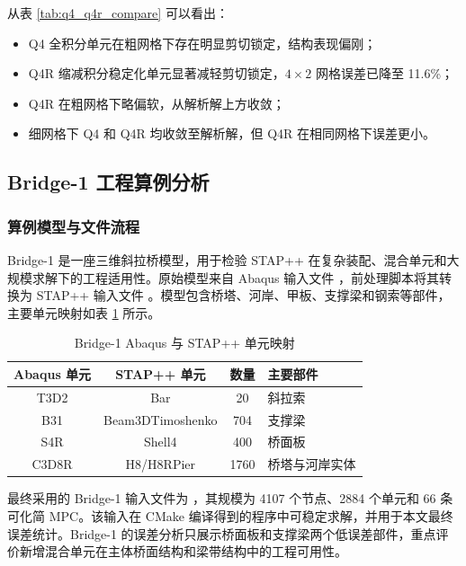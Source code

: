 \documentclass[UTF8,a4paper,zihao=-4]{ctexart}
\begin{document}
从表 \ref{tab:q4_q4r_compare} 可以看出：

\begin{itemize}
    \item Q4 全积分单元在粗网格下存在明显剪切锁定，结构表现偏刚；
    \item Q4R 缩减积分稳定化单元显著减轻剪切锁定，$4\times2$ 网格误差已降至 11.6\%；
    \item Q4R 在粗网格下略偏软，从解析解上方收敛；
    \item 细网格下 Q4 和 Q4R 均收敛至解析解，但 Q4R 在相同网格下误差更小。
\end{itemize}

\subsection{Bridge-1 工程算例分析}

\subsubsection{算例模型与文件流程}

Bridge-1 是一座三维斜拉桥模型，用于检验 STAP++ 在复杂装配、混合单元和大规模求解下的工程适用性。原始模型来自 Abaqus 输入文件 ，前处理脚本将其转换为 STAP++ 输入文件 。模型包含桥塔、河岸、甲板、支撑梁和钢索等部件，主要单元映射如表 \ref{tab:bridge1_mapping} 所示。

\begin{table}[H]
    \centering
    \caption{Bridge-1 Abaqus 与 STAP++ 单元映射}
    \label{tab:bridge1_mapping}
    \begin{tabular}{cccl}
        \toprule
        Abaqus 单元 & STAP++ 单元 & 数量 & 主要部件\\
        \midrule
        T3D2 & Bar & 20 & 斜拉索\\
        B31 & Beam3DTimoshenko & 704 & 支撑梁\\
        S4R & Shell4 & 400 & 桥面板\\
        C3D8R & H8/H8RPier & 1760 & 桥塔与河岸实体\\
        \bottomrule
    \end{tabular}
\end{table}

最终采用的 Bridge-1 输入文件为 ，其规模为 4107 个节点、2884 个单元和 66 条可化简 MPC。该输入在 CMake 编译得到的程序中可稳定求解，并用于本文最终误差统计。Bridge-1 的误差分析只展示桥面板和支撑梁两个低误差部件，重点评价新增混合单元在主体桥面结构和梁带结构中的工程可用性。
\end{document}
